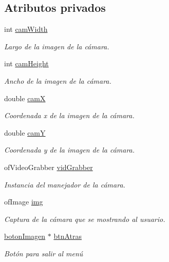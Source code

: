 \subsection*{Atributos privados}
\begin{DoxyCompactItemize}
\item 
int \hyperlink{classespacio_camara_aa357745006c6358ac4919ea079e80caa}{cam\+Width}
\begin{DoxyCompactList}\small\item\em Largo de la imagen de la cámara. \end{DoxyCompactList}\item 
int \hyperlink{classespacio_camara_ac9c3980d5710ce9ae83a95a4e7d4bf3a}{cam\+Height}
\begin{DoxyCompactList}\small\item\em Ancho de la imagen de la cámara. \end{DoxyCompactList}\item 
double \hyperlink{classespacio_camara_ac94dd88aad08d2077050c79e490d0a37}{cam\+X}
\begin{DoxyCompactList}\small\item\em Coordenada x de la imagen de la cámara. \end{DoxyCompactList}\item 
double \hyperlink{classespacio_camara_a0dec829b25bb09c1f70150f885d9843e}{cam\+Y}
\begin{DoxyCompactList}\small\item\em Coordenada y de la imagen de la cámara. \end{DoxyCompactList}\item 
of\+Video\+Grabber \hyperlink{classespacio_camara_a005166cb15e10461341d0e28b145134f}{vid\+Grabber}
\begin{DoxyCompactList}\small\item\em Instancia del manejador de la cámara. \end{DoxyCompactList}\item 
of\+Image \hyperlink{classespacio_camara_a71d14cf73376b62e3158e90a6f72d18f}{img}
\begin{DoxyCompactList}\small\item\em Captura de la cámara que se mostrando al usuario. \end{DoxyCompactList}\item 
\hyperlink{classboton_imagen}{boton\+Imagen} $\ast$ \hyperlink{classespacio_camara_a4d7caffe8a3090acf04dc78ed91e923c}{btn\+Atras}
\begin{DoxyCompactList}\small\item\em Botón para salir al menú \end{DoxyCompactList}\item 

\end{DoxyCompactItemize}
